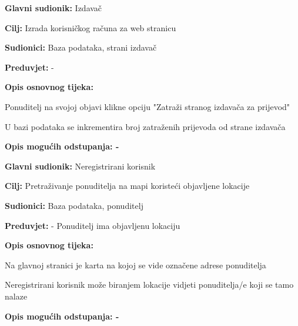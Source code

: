                     \noindent {}
					\begin{packed_item}
	
						\item \textbf{Glavni sudionik: } Izdavač
						\item  \textbf{Cilj:} Izrada korisničkog računa za web stranicu
						\item  \textbf{Sudionici:} Baza podataka, strani izdavač
						\item  \textbf{Preduvjet:} -
						\item  \textbf{Opis osnovnog tijeka:}
						
						\item[] \begin{packed_enum}
	
							\item Ponuditelj na svojoj objavi klikne opciju "Zatraži stranog izdavača za prijevod"
                            \item U bazi podataka se inkrementira broj zatraženih prijevoda od strane izdavača
						\end{packed_enum}
						
						\item  \textbf{Opis mogućih odstupanja: -}
					\end{packed_item}

                    \noindent {}
					\begin{packed_item}
	
						\item \textbf{Glavni sudionik: } Neregistrirani korisnik
						\item  \textbf{Cilj:} Pretraživanje ponuditelja na mapi koristeći objavljene lokacije
						\item  \textbf{Sudionici:} Baza podataka, ponuditelj
						\item  \textbf{Preduvjet:} - Ponuditelj ima objavljenu lokaciju
						\item  \textbf{Opis osnovnog tijeka:}
						
						\item[] \begin{packed_enum}
	
							\item Na glavnoj stranici je karta na kojoj se vide označene adrese ponuditelja
                            \item Neregistrirani korisnik može biranjem lokacije vidjeti ponuditelja/e koji se tamo nalaze
						\end{packed_enum}
						
						\item  \textbf{Opis mogućih odstupanja: -}
					\end{packed_item}

